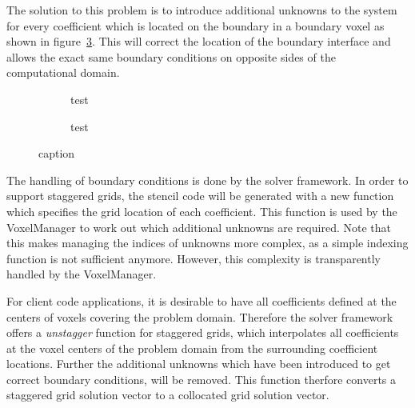 The solution to this problem is to introduce additional unknowns to the system for every coefficient which is located on the boundary in a boundary voxel as shown in figure~\ref{fig:pn_staggered_grid_handled_bc}. This will correct the location of the boundary interface and allows the exact same boundary conditions on opposite sides of the computational domain.
\begin{figure}[h]
\centering
\begin{subfigure}{0.49\columnwidth}
\caption{test}
\label{fig:pn_staggering_correct_bc}
\end{subfigure}%
\hspace{0.01\columnwidth}
\begin{subfigure}{0.49\columnwidth}
\caption{test}
\label{fig:pn_staggering_correct_bc_checkerboard}
\end{subfigure}%
\caption{caption}
\label{fig:pn_staggered_grid_handled_bc}
\end{figure}

The handling of boundary conditions is done by the solver framework. In order to support staggered grids, the stencil code will be generated with a new function which specifies the grid location of each coefficient. This function is used by the VoxelManager to work out which additional unknowns are required. Note that this makes managing the indices of unknowns more complex, as a simple indexing function is not sufficient anymore. However, this complexity is transparently handled by the VoxelManager.

For client code applications, it is desirable to have all coefficients defined at the centers of voxels covering the problem domain. Therefore the solver framework offers a \emph{unstagger} function for staggered grids, which interpolates all coefficients at the voxel centers of the problem domain from the surrounding coefficient locations. Further the additional unknowns which have been introduced to get correct boundary conditions, will be removed. This function therfore converts a staggered grid solution vector to a collocated grid solution vector.

